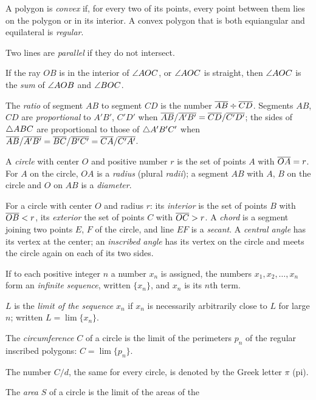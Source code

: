 \documentclass[11pt]{book}
\begin{document}
\begin{applist}
      A polygon is \emph{convex} if, for every two of its points, every
      point between them lies on the polygon or in its interior. A convex
      polygon that is both equiangular and equilateral is \emph{regular}.
\item Two lines are \emph{parallel} if they do not intersect.
\item If the ray $OB$ is in the interior of $\angle AOC$, or $\angle AOC$ is
      straight, then $\angle AOC$ is the \emph{sum} of $\angle AOB$ and
      $\angle BOC$.
\item The \emph{ratio} of segment $AB$ to segment $CD$ is the number
      $\overline{AB} \div \overline{CD}$. Segments $AB$, $CD$ are \emph{proportional} to
      $A'B'$, $C'D'$ when $\overline{AB}/\overline{A'B'} = \overline{CD}/\overline{C'D'}$; the sides
      of $\triangle ABC$ are proportional to those of $\triangle A'B'C'$ when
      $\overline{AB}/\overline{A'B'} = \overline{BC}/\overline{B'C'} = \overline{CA}/\overline{C'A'}$.
\item A \emph{circle} with center $O$ and positive number $r$ is the set of
      points $A$ with $\overline{OA} = r$. For $A$ on the circle, $OA$ is a
      \emph{radius} (plural \emph{radii}); a segment $AB$ with $A$, $B$ on
      the circle and $O$ on $AB$ is a \emph{diameter}.
\item For a circle with center $O$ and radius $r$: its \emph{interior} is
      the set of points $B$ with $\overline{OB} < r$, its \emph{exterior} the set
      of points $C$ with $\overline{OC} > r$. A \emph{chord} is a segment joining
      two points $E$, $F$ of the circle, and line $EF$ is a \emph{secant}. A
      \emph{central angle} has its vertex at the center; an \emph{inscribed
      angle} has its vertex on the circle and meets the circle again on each
      of its two sides.
\item If to each positive integer $n$ a number $x_n$ is assigned, the
      numbers $x_1, x_2, \ldots, x_n$ form an \emph{infinite sequence},
      written $\{x_n\}$, and $x_n$ is its $n$th term.
\item $L$ is the \emph{limit of the sequence} $x_n$ if $x_n$ is necessarily
      arbitrarily close to $L$ for large $n$; written $L = \lim \{x_n\}$.
\item The \emph{circumference} $C$ of a circle is the limit of the
      perimeters $p_n$ of the regular inscribed polygons: $C = \lim \{p_n\}$.
\item The number $C/d$, the same for every circle, is denoted by the Greek
      letter $\pi$ (pi).
\item The \emph{area} $S$ of a circle is the limit of the areas of the

\end{applist}
\end{document}
